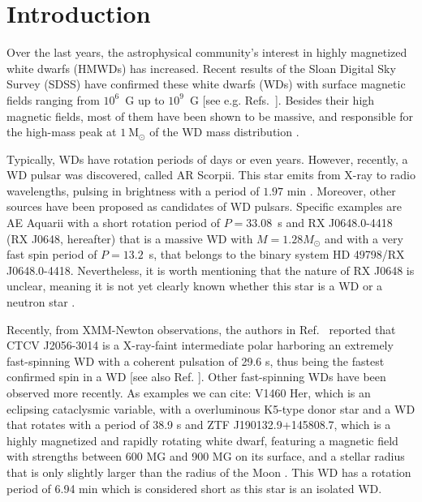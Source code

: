 \documentclass{ws-procs961x669}            %
\begin{document}
\bodymatter


\section{Introduction}
\label{aba:sec1}

Over the last years, the astrophysical community's interest in highly magnetized white dwarfs (HMWDs) has increased. Recent results of the Sloan Digital Sky Survey (SDSS) have confirmed these white dwarfs (WDs) with surface magnetic fields ranging from $10^6$~G up to $10^9$~G [see e.g. Refs.~]. Besides their high magnetic fields, most of them have been shown to be massive, and responsible for the high-mass peak at $1~\textrm{M}_\odot$ of the WD mass distribution \cite{2009A&A...506.1341K,1992ApJ...394..603S,2010A&A...524A..36K}. 

Typically, WDs have rotation periods of days or even years. However, recently, a WD pulsar was discovered, called AR Scorpii. This star emits from X-ray to radio wavelengths, pulsing in brightness with a period of $1.97$ min \cite{2016Natur.537..374M}. Moreover, other sources have been proposed as candidates of WD pulsars. Specific examples are AE Aquarii with a short rotation period of $P=33.08$~s \cite{2008PASJ...60..387T} and RX J0648.0-4418 (RX J0648, hereafter) that is a massive WD with $M=1.28M_\odot$ and with a very fast spin period of $P = 13.2$~s, that belongs to the binary system HD 49798/RX J0648.0-4418\cite{2009Sci...325.1222M}. Nevertheless, it is worth mentioning that the nature of RX J0648 is unclear, meaning it is not yet clearly known whether this star is a WD or a neutron star \cite{mereghetti2016,popov2017}.

Recently, from XMM-Newton observations, the authors in Ref.~ reported that CTCV J2056-3014 is a X-ray-faint intermediate polar harboring an extremely fast-spinning WD with a coherent pulsation of 29.6 s, thus being the fastest confirmed spin in a WD [see also Ref. ]. Other fast-spinning WDs have been observed more recently. As examples we can cite: V1460 Her, which is an eclipsing cataclysmic variable, with a overluminous K5-type donor star and a WD that rotates with a period of 38.9 s \cite{Ashley2020} and ZTF J190132.9+145808.7, which is a highly magnetized and rapidly rotating white dwarf, featuring a magnetic field  with strengths between 600 MG and 900 MG on its surface, and a stellar radius that is only slightly larger than the radius of the Moon \cite{caiazzo2021highly}. This WD has a rotation period of 6.94 min which is considered short as this star is an isolated WD.
\end{document}
